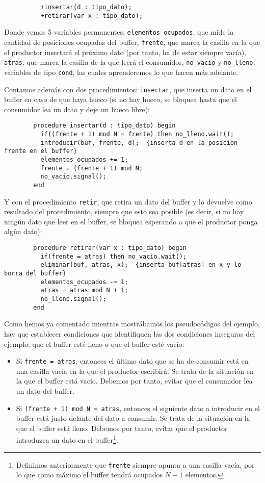 \begin{ejemplo}
\begin{verbatim}
          +insertar(d : tipo_dato);
          +retirar(var x : tipo_dato);
    \end{verbatim}
    Donde vemos 5 variables permanentes: \verb|elementos_ocupados|, que mide la cantidad de posiciones ocupadas del buffer, \verb|frente|, que marca la casilla en la que el productor insertará el próximo dato (por tanto, ha de estar siempre vacía), \verb|atras|, que marca la casilla de la que leerá el consumidor, \verb|no_vacio| y \verb|no_lleno|, variables de tipo \verb|cond|, las cuales aprenderemos lo que hacen más adelante.
    
    Contamos además con dos procedimientos: \verb|insertar|, que inserta un dato en el buffer en caso de que haya hueco (si no hay hueco, se bloquea hasta que el consumidor lea un dato y deje un hueco libre):
    \begin{verbatim}
        procedure insertar(d : tipo_dato) begin
          if((frente + 1) mod N = frente) then no_lleno.wait();
          introducir(buf, frente, d);  {inserta d en la posicion frente en el buffer}
          elementos_ocupados += 1;
          frente = (frente + 1) mod N;
          no_vacio.signal();
        end
    \end{verbatim}
    Y con el procedimiento \verb|retir|, que retira un dato del buffer y lo devuelve como resultado del procedimiento, siempre que esto sea posible (es decir, si no hay ningún dato que leer en el buffer, se bloquea esperando a que el productor ponga algún dato):
    \begin{verbatim}
        procedure retirar(var x : tipo_dato) begin
          if(frente = atras) then no_vacio.wait();
          eliminar(buf, atras, x);  {inserta buf[atras] en x y lo borra del buffer}
          elementos_ocupados -= 1;
          atras = atras mod N + 1;
          no_lleno.signal();
        end
    \end{verbatim}
    Como hemos ya comentado mientras mostrábamos los pseudocódigos del ejemplo, hay que establecer condiciones que identifiquen las dos condiciones inseguras del ejemplo: que el buffer esté lleno o que el buffer esté vacío:
    \begin{itemize}
        \item Si \verb|frente = atras|, entonces el último dato que se ha de consumir está en una casilla vacía en la que el productor escribirá. Se trata de la situación en la que el buffer está vacío. Debemos por tanto, evitar que el consumidor lea un dato del buffer.
        \item Si \verb|(frente + 1) mod N = atras|, entonces el siguiente dato a introducir en el buffer está justo delante del dato a consumir. Se trata de la situación en la que el buffer está lleno. Debemos por tanto, evitar que el productor introduzca un dato en el buffer\footnote{Definimos anteriormente que \texttt{frente} siempre apunta a una casilla vacía, por lo que como máximo el buffer tendrá ocupados $N-1$ elementos.}.

\end{itemize}
\end{ejemplo}
